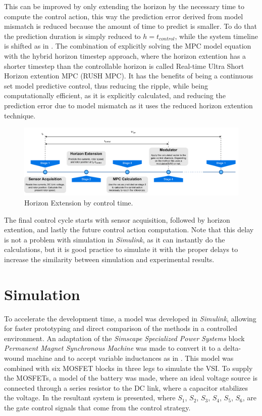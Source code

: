 \documentclass[9pt,conference]{IEEEtran}
\begin{document}
This can be improved by only extending the horizon by the necessary time to compute the control action, this way the prediction error derived from model mismatch is reduced because the amount of time to predict is smaller. To do that the prediction duration is simply reduced to $h = t_{control}$, while the system timeline is shifted as in . The combination of explicitly solving the MPC model equation with the hybrid horizon timestep approach, where the horizon extention has a shorter timestep than the controllable horizon is called Real-time Ultra Short Horizon extention MPC (RUSH MPC). It has the benefits of being a continuous set model predictive control, thus reducing the ripple, while being computationally efficient, as it is explicitly calculated, and reducing the prediction error due to model mismatch as it uses the reduced horizon extention technique.

\begin{figure}[!htb]
	\centering
	\includegraphics[width=.8\linewidth]{Figures/Horizon Extension Timeline.pdf}
	\caption[Horizon Extension by control time.]{Horizon Extension by control time.}
	\label{fig:horizon_extend_timeline} %
\end{figure}

The final control cycle starts with sensor acquisition, followed by horizon extention, and lastly the future control action computation. Note that this delay is not a problem with simulation in \textit{Simulink}, as it can instantly do the calculations, but it is good practice to simulate it with the proper delays to increase the similarity between simulation and experimental results.

\section{Simulation}
\label{section:simulation}%

To accelerate the development time, a model was developed in \textit{Simulink}, allowing for faster prototyping and direct comparison of the methods in a controlled environment. An adaptation of the \textit{Simscape Specialized Power Systems} block \textit{Permanent Magnet Synchronous Machine} was made to convert it to a delta-wound machine and to accept variable inductances as in . 
This model was combined with six MOSFET blocks in three legs to simulate the VSI. To supply the MOSFETs, a model of the battery was made, where an ideal voltage source is connected through a series resistor to the DC link, where a capacitor stabilizes the voltage. In  the resultant system is presented, where $S_1$, $S_2$, $S_3$, $S_4$, $S_5$, $S_6$, are the gate control signals that come from the control strategy.
\end{document}
